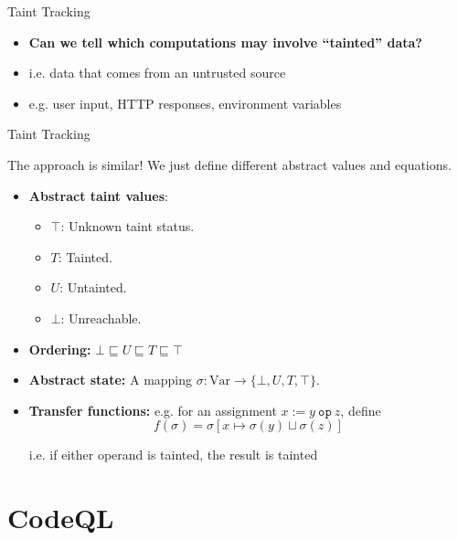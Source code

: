 \documentclass[aspectratio=169,xcolor=dvipsnames]{beamer}
\begin{document}

\begin{frame}{Taint Tracking}
	\begin{itemize}
		\item {\bf Can we tell which computations may involve ``tainted'' data?}
		\item i.e. data that comes from an untrusted source
		\item e.g. user input, HTTP responses, environment variables
	\end{itemize}
\end{frame}


\begin{frame}{Taint Tracking}

	The approach is similar! We just define different abstract values and
	equations. \bigskip

	\begin{itemize}
		\item \textbf{Abstract taint values}:
		      \begin{itemize}
			      \item $\top$: Unknown taint status.
			      \item $T$: Tainted.
			      \item $U$: Untainted.
			      \item $\bot$: Unreachable.
		      \end{itemize}
		\item \textbf{Ordering:} $\bot \sqsubseteq U \sqsubseteq T \sqsubseteq \top$
		\item \textbf{Abstract state:} A mapping $\sigma: \text{Var} \rightarrow \{ \bot, U, T, \top \}$.
		\item \textbf{Transfer functions:}
		      e.g. for an assignment $x := y\ \texttt{op}\ z$, define
		      \[
			      f(\sigma) = \sigma[x \mapsto \sigma(y) \sqcup \sigma(z)]
		      \]

		      i.e. if either operand is tainted, the result is tainted
	\end{itemize}
\end{frame}

\section{CodeQL}
\end{document}
